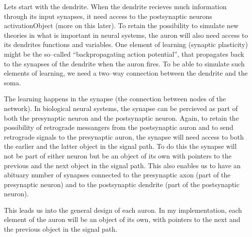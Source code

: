 
		Lets start with the dendrite. When the dendrite recieves much information through its input synapses, it need access to the postsynaptic neurons activationObject (more on this later). %
		To retain the possibility to simulate new theories in what is important in neural systems, the auron will also need access to its dendrites functions and variables. 
		One element of learning (synaptic plasticity) might be the so--called ``backpropagating action potential'', that propagates back to the synapses of the dendrite when the auron fires.
		To be able to simulate such elements of learning, we need a two--way connection between the dendrite and the soma.


		The learning happens in the synapse (the connection between nodes of the network). In biological neural systems, the synapse can be percieved as part of both the presynaptic neuron and the postsynaptic neuron.
		Again, to retain the possibility of retrograde messangers from the postsynaptic auron and to send retrograde signals to the presynaptic auron, the synapse will need access to both the earlier and the latter object in the signal path. To do this the synapse will not be part of either neuron but be an object of its own with pointers to the previous and the next object in the signal path. 
		This also enables us to have an abituary number of synapses connected to the presynaptic axon (part of the presynaptic neuron) and to the postsynaptic dendrite (part of the postsynaptic neuron).

		This leads us into the general design of each auron. In my implementation, each element of the auron will be an object of its own, with pointers to the next and the previous object in the signal path.



